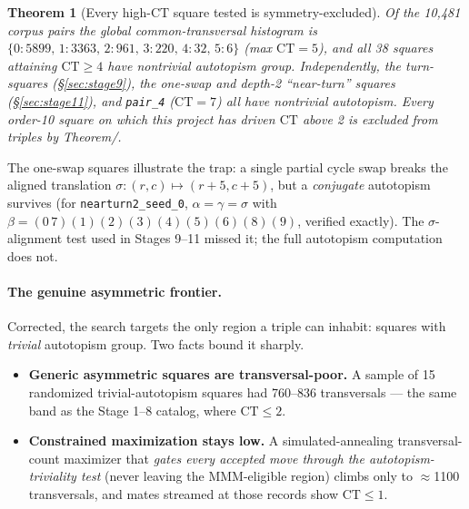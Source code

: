 \documentclass[11pt,a4paper]{article}
\newtheorem{theorem}{Theorem}[section]
\theoremstyle{remark}
\newcommand{\CT}{\mathrm{CT}}
\begin{document}
\begin{theorem}[Every high-$\CT$ square tested is symmetry-excluded]
\label{thm:allexcluded}
Of the 10{,}481 corpus pairs the global common-transversal histogram is
$\{0{:}5899,\,1{:}3363,\,2{:}961,\,3{:}220,\,4{:}32,\,5{:}6\}$ (max $\CT=5$),
and \emph{all} 38 squares attaining $\CT\geq 4$ have nontrivial autotopism
group. Independently, the turn-squares (\S\ref{sec:stage9}), the one-swap
and depth-2 ``near-turn'' squares (\S\ref{sec:stage11}), and \texttt{pair\_4}
($\CT=7$) all have nontrivial autotopism. Every order-10 square on which
this project has driven $\CT$ above 2 is excluded from triples by
Theorem/\cite{mmm2007}.
\end{theorem}

The one-swap squares illustrate the trap: a single partial cycle swap
breaks the aligned translation $\sigma:(r,c)\mapsto(r{+}5,c{+}5)$, but a
\emph{conjugate} autotopism survives (for \texttt{nearturn2\_seed\_0},
$\alpha=\gamma=\sigma$ with $\beta=(0\,7)(1)(2)(3)(4)(5)(6)(8)(9)$,
verified exactly). The $\sigma$-alignment test used in Stages 9--11
missed it; the full autotopism computation does not.

\paragraph{The genuine asymmetric frontier.} Corrected, the search targets
the only region a triple can inhabit: squares with \emph{trivial}
autotopism group. Two facts bound it sharply.
\begin{itemize}[noitemsep]
  \item \textbf{Generic asymmetric squares are transversal-poor.} A sample
    of 15 randomized trivial-autotopism squares had 760--836 transversals
    --- the same band as the Stage 1--8 catalog, where $\CT\leq 2$.
  \item \textbf{Constrained maximization stays low.} A simulated-annealing
    transversal-count maximizer that \emph{gates every accepted move through
    the autotopism-triviality test} (never leaving the MMM-eligible region)
    climbs only to $\approx$1100 transversals, and mates streamed at those
    records show $\CT \leq 1$.
\end{itemize}
\end{document}
